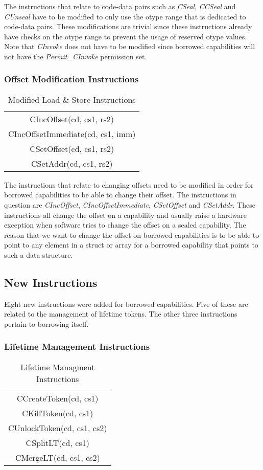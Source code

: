 The instructions that relate to code-data pairs such as \textit{CSeal}, \textit{CCSeal} and \textit{CUnseal} have to be modified to only use the otype range that is dedicated to code-data pairs. These modifications are trivial since these instructions already have checks on the otype range to prevent the usage of reserved otype values. Note that \textit{CInvoke} does not have to be modified since borrowed capabilities will not have the \textit{Permit\_CInvoke} permission set.

\subsubsection{Offset Modification Instructions}
\begin{table}[h]
\centering
\begin{tabular}{| c |}
\hline
 CIncOffset(cd, cs1, rs2) \\
 CIncOffsetImmediate(cd, cs1, imm) \\
 CSetOffset(cd, cs1, rs2) \\
 CSetAddr(cd, cs1, rs2) \\
\hline
\end{tabular}
\caption{Modified Load \& Store Instructions}
\label{table:borrowmodoffset}
\end{table}
The instructions that relate to changing offsets need to be modified in order for borrowed capabilities to be able to change their offset. The instructions in question are \textit{CIncOffset}, \textit{CIncOffsetImmediate}, \textit{CSetOffset} and \textit{CSetAddr}. These instructions all change the offset on a capability and usually raise a hardware exception when software tries to change the offset on a sealed capability. The reason that we want to change the offset on borrowed capabilities is to be able to point to any element in a struct or array for a borrowed capability that points to such a data structure.

\subsection{New Instructions}
Eight new instructions were added for borrowed capabilities. Five of these are related to the management of lifetime tokens. The other three instructions pertain to borrowing itself.

\subsubsection{Lifetime Management Instructions}
\label{sec:lifetimeinsts}
\begin{table}[h]
\centering
\begin{tabular}{| c |}
\hline
 CCreateToken(cd, cs1) \\
 CKillToken(cd, cs1) \\
 CUnlockToken(cd, cs1, cs2) \\
 CSplitLT(cd, cs1) \\
 CMergeLT(cd, cs1, cs2) \\
\hline
\end{tabular}
\caption{Lifetime Managment Instructions}
\label{table:borrowedinstslifetime}
\end{table}

